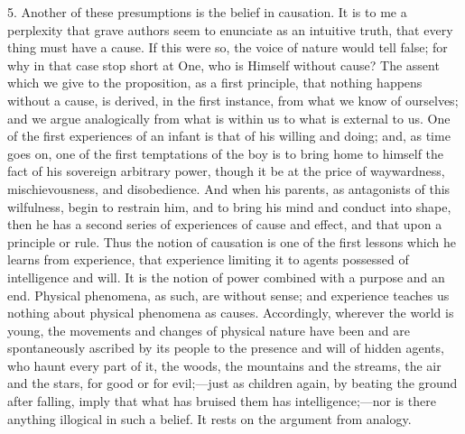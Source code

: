 5. Another of these presumptions is the belief in causation. It is
to me a perplexity that grave authors seem to enunciate as an
intuitive truth, that every thing must have a cause. If this were so,
the voice of nature would tell false; for why in that case stop short
at One, who is Himself without cause? The assent which we give to the
proposition, as a first principle, that nothing happens without a
cause, is derived, in the first instance, from what we know of
ourselves; and we argue analogically from what is within us to what is
external to us. One of the first experiences of an infant is that of
his willing and doing; and, as time goes on, one of the first
temptations of the boy is to bring home to himself the fact of his
sovereign arbitrary power, though it be at the price of waywardness,
mischievousness, and disobedience. And when his parents, as
antagonists of this wilfulness, begin to restrain him, and to bring
his mind and conduct into shape, then he has a second series of
experiences of cause and effect, and that upon a principle or rule.
Thus the notion of causation is one of the first lessons which he
learns from experience, that experience limiting it to agents
possessed of intelligence and will. It is the notion of power combined
with a purpose and an end. Physical phenomena, as such, are without
sense; and experience teaches us nothing about physical phenomena as
causes. Accordingly, wherever the world is young, the movements and
changes of physical nature have been and are spontaneously ascribed by
its people to the presence and will of hidden agents, who haunt every
part of it, the woods, the mountains and the streams, the air and the
stars, for good or for evil;—just as children again, by beating
the ground after falling, imply that what has bruised them has
intelligence;—nor is there anything illogical in such a belief. It
rests on the argument from analogy.

